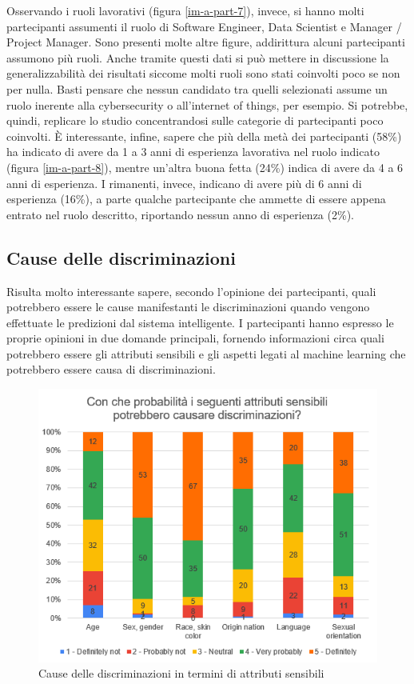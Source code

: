 Osservando i ruoli lavorativi (figura \ref{im-a-part-7}), invece, si hanno molti partecipanti assumenti il ruolo di Software Engineer, Data Scientist e Manager / Project Manager. Sono presenti molte altre figure, addirittura alcuni partecipanti assumono più ruoli. Anche tramite questi dati si può mettere in discussione la generalizzabilità dei risultati siccome molti ruoli sono stati coinvolti poco se non per nulla. Basti pensare che nessun candidato tra quelli selezionati assume un ruolo inerente alla cybersecurity o all'internet of things, per esempio. Si potrebbe, quindi, replicare lo studio concentrandosi sulle categorie di partecipanti poco coinvolti. È interessante, infine, sapere che più della metà dei partecipanti (58\%) ha indicato di avere da 1 a 3 anni di esperienza lavorativa nel ruolo indicato (figura \ref{im-a-part-8}), mentre un'altra buona fetta (24\%) indica di avere da 4 a 6 anni di esperienza. I rimanenti, invece, indicano di avere più di 6 anni di esperienza (16\%), a parte qualche partecipante che ammette di essere appena entrato nel ruolo descritto, riportando nessun anno di esperienza (2\%).\\

\newpage

\subsection{Cause delle discriminazioni}
Risulta molto interessante sapere, secondo l'opinione dei partecipanti, quali potrebbero essere le cause manifestanti le discriminazioni quando vengono effettuate le predizioni dal sistema intelligente. I partecipanti hanno espresso le proprie opinioni in due domande principali, fornendo informazioni circa quali potrebbero essere gli attributi sensibili e gli aspetti legati al machine learning che potrebbero essere causa di discriminazioni.\\

\begin{figure}[h!]
    \centering
    \includegraphics[width=360pt]{figure/data-analysis2/root1.png}
    \caption{Cause delle discriminazioni in termini di attributi sensibili}
    \label{im-a-root-1}
\end{figure}

